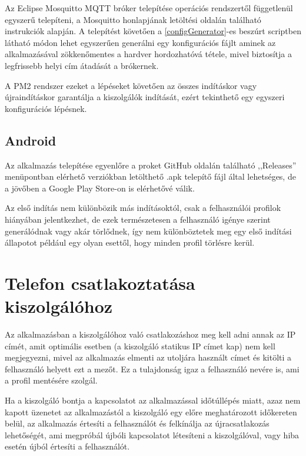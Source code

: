 \documentclass[]{thesis-ekf}
\theoremstyle{definition}
\theoremstyle{remark}
\begin{document}
Az Eclipse Mosquitto MQTT bróker telepítése operációs rendszertől függetlenül egyszerű telepíteni, a Mosquitto
honlapjának letöltési oldalán található instrukciók alapján. A telepítést követően a \ref{configGenerator}-es
beszúrt scriptben látható módon lehet egyszerűen generálni egy konfigurációs fájlt aminek az alkalmazásával
zökkenőmentes a hardver hordozhatóvá tétele, mivel biztosítja a legfrissebb helyi cím átadását a brókernek.

A PM2 rendszer ezeket a lépéseket követően az összes indításkor vagy újraindításkor garantálja a kiszolgálók
indítását, ezért tekinthető egy egyszeri konfigurációs lépésnek.


\subsection{Android}
Az alkalmazás telepítése egyenlőre a proket GitHub oldalán\cite{github}
található ,,Releases'' menüpontban elérhető verziókban letölthető .apk telepítő fájl által lehetséges, de a jövőben
a Google Play Store-on is elérhetővé válik.

Az első indítás nem különbözik más indításoktól, csak a felhasználói profilok hiányában jelentkezhet, de ezek
természetesen a felhasználó igénye szerint generálódnak vagy akár törlődnek, így nem különböztetek meg egy 
első indítási állapotot például egy olyan esettől, hogy minden profil törlésre kerül.

\section{Telefon csatlakoztatása kiszolgálóhoz}
Az alkalmazásban a kiszolgálóhoz való csatlakozáshoz meg kell adni annak az IP címét, amit optimális esetben
(a kiszolgáló statikus IP címet kap) nem kell megjegyezni, mivel az alkalmazás  elmenti az utoljára használt címet
és kitölti a felhasználó helyett ezt a mezőt. Ez a tulajdonság igaz a felhasználó nevére is, ami a profil mentésére
szolgál.

Ha a kiszolgáló bontja a kapcsolatot az alkalmazással időtúllépés miatt, azaz nem kapott üzenetet az alkalmazástól
a kiszolgáló egy előre meghatározott időkereten belül, az alkalmazás értesíti a felhasználót és felkínálja
az újracsatlakozás lehetőségét, ami megpróbál újbóli kapcsolatot létesíteni a kiszolgálóval, vagy hiba esetén
újból értesíti a felhasználót.
\end{document}
